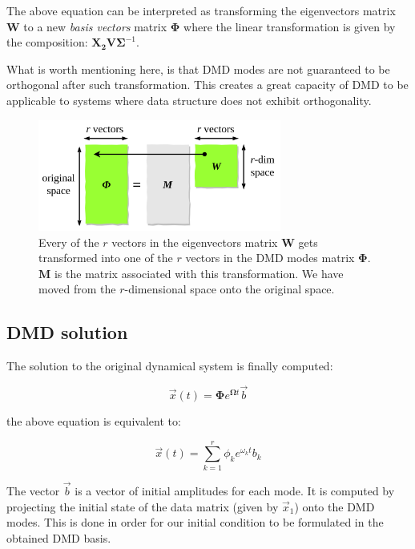 \documentclass[10pt,twocolumn]{article}
\begin{document}
The above equation can be interpreted as transforming the eigenvectors matrix $\bm{W}$ to a new \textit{basis vectors} matrix $\bm{\Phi}$ where the linear transformation is given by the composition: $\bm{X_2} \bm{V} \bm{\Sigma}^{-1}$.

What is worth mentioning here, is that DMD modes are not guaranteed to be orthogonal after such transformation. This creates a great capacity of DMD to be applicable to systems where data structure does not exhibit orthogonality.

\begin{figure}[H]
\centering\includegraphics[width=8cm]{dmd-modes-transformation.png}
\caption{Every of the $r$ vectors in the eigenvectors matrix $\bm{W}$ gets transformed into one of the $r$ vectors in the DMD modes matrix $\bm{\Phi}$. $\bm{M}$ is the matrix associated with this transformation. We have moved from the $r$-dimensional space onto the original space.}
\label{fig:linear_system}
\end{figure}

\subsection{DMD solution}

The solution to the original dynamical system is finally computed:

\begin{equation} \label{eq:x-solution-matrix}
\vec{x}(t) = \bm{\Phi} e^{\bm{\Omega} t} \vec{b}
\end{equation}

the above equation is equivalent to:

\begin{equation} \label{eq:x-solution-summation}
\vec{x}(t)  = \sum_{k=1}^{r} \phi_k e^{\omega_k t} b_k
\end{equation}

The vector $\vec{b}$ is a vector of initial amplitudes for each mode. It is computed by projecting the initial state of the data matrix (given by $\vec{x}_1$) onto the DMD modes. This is done in order for our initial condition to be formulated in the obtained DMD basis.
\end{document}

